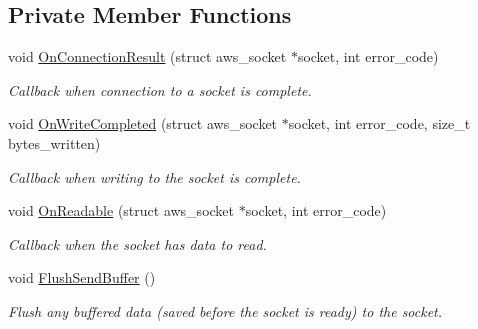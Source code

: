 \subsection*{Private Member Functions}
\begin{DoxyCompactItemize}
\item 
\mbox{\label{class_aws_1_1_iot_1_1_device_client_1_1_secure_tunneling_1_1_tcp_forward_a1c0858f85b387468dd56715ffdf9ee92}} 
void \hyperlink{class_aws_1_1_iot_1_1_device_client_1_1_secure_tunneling_1_1_tcp_forward_a1c0858f85b387468dd56715ffdf9ee92}{On\+Connection\+Result} (struct aws\+\_\+socket $\ast$socket, int error\+\_\+code)
\begin{DoxyCompactList}\small\item\em Callback when connection to a socket is complete. \end{DoxyCompactList}\item 
\mbox{\label{class_aws_1_1_iot_1_1_device_client_1_1_secure_tunneling_1_1_tcp_forward_ae2d1c879f7f37bdfe7a965ad6736b7df}} 
void \hyperlink{class_aws_1_1_iot_1_1_device_client_1_1_secure_tunneling_1_1_tcp_forward_ae2d1c879f7f37bdfe7a965ad6736b7df}{On\+Write\+Completed} (struct aws\+\_\+socket $\ast$socket, int error\+\_\+code, size\+\_\+t bytes\+\_\+written)
\begin{DoxyCompactList}\small\item\em Callback when writing to the socket is complete. \end{DoxyCompactList}\item 
\mbox{\label{class_aws_1_1_iot_1_1_device_client_1_1_secure_tunneling_1_1_tcp_forward_a60a65f8be68d2008bf5410657e4624ff}} 
void \hyperlink{class_aws_1_1_iot_1_1_device_client_1_1_secure_tunneling_1_1_tcp_forward_a60a65f8be68d2008bf5410657e4624ff}{On\+Readable} (struct aws\+\_\+socket $\ast$socket, int error\+\_\+code)
\begin{DoxyCompactList}\small\item\em Callback when the socket has data to read. \end{DoxyCompactList}\item 
\mbox{\label{class_aws_1_1_iot_1_1_device_client_1_1_secure_tunneling_1_1_tcp_forward_a702830a3834fd824dc013be4c9f355f9}} 
void \hyperlink{class_aws_1_1_iot_1_1_device_client_1_1_secure_tunneling_1_1_tcp_forward_a702830a3834fd824dc013be4c9f355f9}{Flush\+Send\+Buffer} ()
\begin{DoxyCompactList}\small\item\em Flush any buffered data (saved before the socket is ready) to the socket. \end{DoxyCompactList}\end{DoxyCompactItemize}
